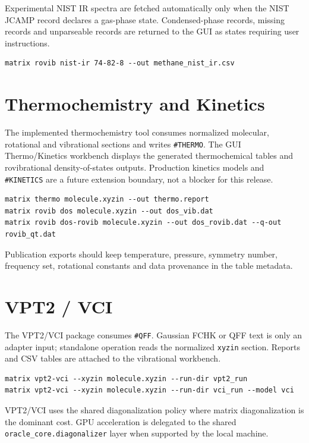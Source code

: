 \documentclass[11pt]{article}
\newcommand{\xyzin}{\texttt{xyzin}}
\newcommand{\sectionname}[1]{\texttt{\##1}}
\begin{document}
Experimental NIST IR spectra are fetched automatically only when the NIST
JCAMP record declares a gas-phase state.  Condensed-phase records, missing
records and unparseable records are returned to the GUI as states requiring
user instructions.

\begin{lstlisting}[style=matrix]
matrix rovib nist-ir 74-82-8 --out methane_nist_ir.csv
\end{lstlisting}

\section{Thermochemistry and Kinetics}

The implemented thermochemistry tool consumes normalized molecular, rotational
and vibrational sections and writes \sectionname{THERMO}.  The GUI
Thermo/Kinetics workbench displays the generated thermochemical tables and
rovibrational density-of-states outputs.  Production kinetics models and
\sectionname{KINETICS} are a future extension boundary, not a blocker for this
release.

\begin{lstlisting}[style=matrix]
matrix thermo molecule.xyzin --out thermo.report
matrix rovib dos molecule.xyzin --out dos_vib.dat
matrix rovib dos-rovib molecule.xyzin --out dos_rovib.dat --q-out rovib_qt.dat
\end{lstlisting}

Publication exports should keep temperature, pressure, symmetry number,
frequency set, rotational constants and data provenance in the table metadata.

\section{VPT2 / VCI}

The VPT2/VCI package consumes \sectionname{QFF}.  Gaussian FCHK or QFF text is
only an adapter input; standalone operation reads the normalized \xyzin{}
section.  Reports and CSV tables are attached to the vibrational workbench.

\begin{lstlisting}[style=matrix]
matrix vpt2-vci --xyzin molecule.xyzin --run-dir vpt2_run
matrix vpt2-vci --xyzin molecule.xyzin --run-dir vci_run --model vci
\end{lstlisting}

VPT2/VCI uses the shared diagonalization policy where matrix diagonalization is
the dominant cost.  GPU acceleration is delegated to the shared
\texttt{oracle\_core.diagonalizer} layer when supported by the local machine.
\end{document}
